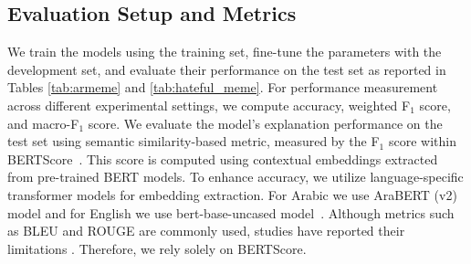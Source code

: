 \noindent
\subsection{Evaluation Setup and Metrics}
We train the models using the training set, fine-tune the parameters with the development set, and evaluate their performance on the test set as reported in Tables \ref{tab:armeme} and \ref{tab:hateful_meme}. 
%
For performance measurement across different experimental settings, we compute accuracy, weighted F$_1$ score, and macro-F$_1$ score. 
We evaluate the model's explanation performance on the test set using semantic similarity-based metric, measured by the F$_1$ score within BERTScore~\citep{zhangbertscore}. This score is computed using contextual embeddings extracted from pre-trained BERT models. To enhance accuracy, we utilize language-specific transformer models for embedding extraction. For Arabic we use AraBERT (v2)~\cite{baly2020arabert} model and for English we use bert-base-uncased model~\cite{devlin2019bert}. Although metrics such as BLEU and ROUGE are commonly used, studies have reported their limitations \cite{xu2023critical, krishna-etal-2021-hurdles}. Therefore, we rely solely on BERTScore.  

